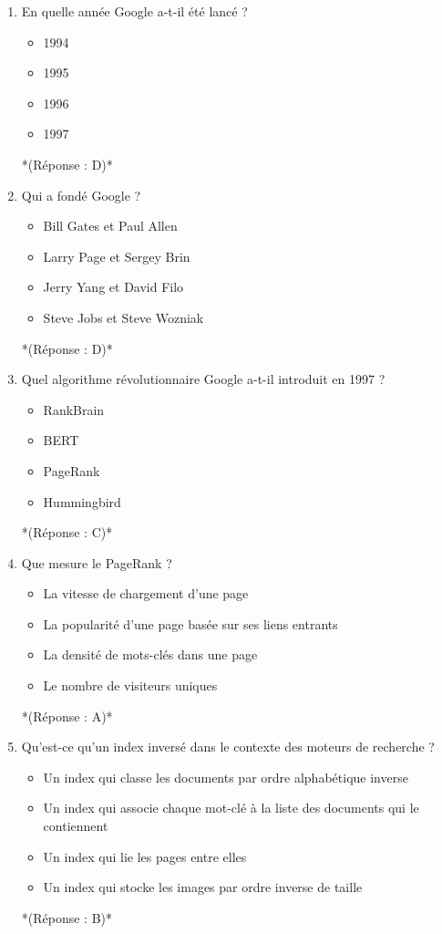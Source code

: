 \documentclass[12pt,a4paper,twoside]{report}
\begin{document}
\begin{enumerate}
\item En quelle année Google a-t-il été lancé ?
\begin{itemize}
\item[A)] 1994
\item[B)] 1995
\item[C)] 1996
\item[D)] 1997
\end{itemize}
*(Réponse : D)*

\item Qui a fondé Google ?
\begin{itemize}
\item[A)] Bill Gates et Paul Allen
\item[B)] Larry Page et Sergey Brin
\item[C)] Jerry Yang et David Filo
\item[D)] Steve Jobs et Steve Wozniak
\end{itemize}
*(Réponse : D)*

\item Quel algorithme révolutionnaire Google a-t-il introduit en 1997 ?
\begin{itemize}
\item[A)] RankBrain
\item[B)] BERT
\item[C)] PageRank
\item[D)] Hummingbird
\end{itemize}
*(Réponse : C)*

\item Que mesure le PageRank ?
\begin{itemize}
\item[A)] La vitesse de chargement d'une page
\item[B)] La popularité d'une page basée sur ses liens entrants
\item[C)] La densité de mots-clés dans une page
\item[D)] Le nombre de visiteurs uniques
\end{itemize}
*(Réponse : A)*

\item Qu'est-ce qu'un index inversé dans le contexte des moteurs de recherche ?
\begin{itemize}
\item[A)] Un index qui classe les documents par ordre alphabétique inverse
\item[B)] Un index qui associe chaque mot-clé à la liste des documents qui le contiennent
\item[C)] Un index qui lie les pages entre elles
\item[D)] Un index qui stocke les images par ordre inverse de taille
\end{itemize}
*(Réponse : B)*


\end{enumerate}
\end{document}
